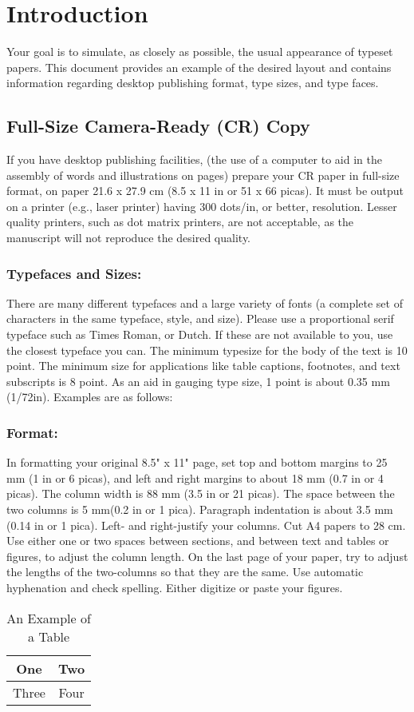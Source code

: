\section{Introduction}

Your goal is to simulate, as closely as possible, the usual appearance of typeset
 papers. This document provides an example of the desired layout and contains
 information regarding desktop publishing format, type sizes, and type faces.

\subsection{Full-Size Camera-Ready (CR) Copy}

If you have desktop publishing facilities, (the use of a computer to aid
 in the assembly of words and illustrations on pages) prepare your CR paper
  in full-size format, on paper 21.6 x 27.9 cm (8.5 x 11 in or 51 x 66 picas).
  It must be output on a printer (e.g., laser printer) having 300 dots/in, or
  better, resolution. Lesser quality printers, such as dot matrix printers,
   are not acceptable, as the manuscript will not reproduce the desired quality.

\subsubsection{Typefaces and Sizes:} There are many different typefaces and a large
variety of fonts (a complete set of characters in the same typeface, style,
 and size). Please use a proportional serif typeface such as Times Roman,
 or Dutch. If these are not available to you, use the closest typeface you
  can. The minimum typesize for the body of the text is 10 point. The minimum
  size for applications like table captions, footnotes, and text subscripts
  is 8 point. As an aid in gauging type size, 1 point is about 0.35 mm (1/72in).
   Examples are as follows:

\subsubsection{Format:} In formatting your original 8.5" x 11" page, set top and
bottom margins to 25 mm (1 in or 6 picas), and left and right margins
to about 18 mm (0.7 in or 4 picas). The column width is 88 mm (3.5 in or 21 picas).
 The space between the two columns is 5 mm(0.2 in or 1 pica). Paragraph
 indentation is about 3.5 mm (0.14 in or 1 pica). Left- and right-justify your
 columns. Cut A4 papers to 28 cm. Use either one or two spaces between sections,
 and between text and tables or figures, to adjust the column length.
  On the last page of your paper, try to adjust the lengths of the
  two-columns so that they are the same. Use automatic hyphenation and
   check spelling. Either digitize or paste your figures.

\begin{table}
\caption{An Example of a Table}
\label{table_example}
\begin{center}
\begin{tabular}{|c||c|}
\hline
One & Two\\
\hline
Three & Four\\
\hline
\end{tabular}
\end{center}
\end{table}



